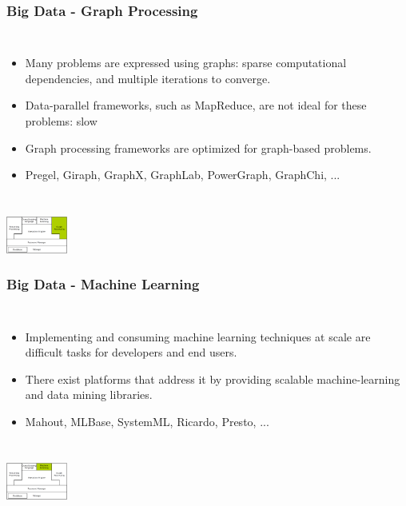 \documentclass{beamer}
\begin{document}
\begin{frame}
\frametitle{Big Data - Graph Processing}
\begin{columns}
\column{30em}
\begin{itemize}\itemsep1em
  \justifying
  \item Many problems are expressed using \textcolor{TextGreen}{graphs}: sparse \textcolor{Ocean}{computational dependencies}, and \textcolor{Ocean}{multiple iterations} to converge.
  \item Data-parallel frameworks, such as MapReduce, are not ideal for these problems: \textcolor{Ocean}{slow}
  \item Graph processing frameworks are \textcolor{Ocean}{optimized} for graph-based problems.
  \item Pregel, Giraph, GraphX, GraphLab, PowerGraph, GraphChi, ...
\end{itemize}
\end{columns}
\vspace{1.33cm}
\hspace*{10cm}\includegraphics[width=2cm]{figs/stack_graph.pdf}
\end{frame}

\begin{frame}
\frametitle{Big Data - Machine Learning}
\begin{columns}
\column{30em}
\begin{itemize}\itemsep1em
  \justifying
  \item Implementing and consuming machine learning techniques at scale are \textcolor{Ocean}{difficult tasks} for developers and end users.
  \item There exist platforms that address it by providing scalable machine-learning and data mining libraries.
  \item Mahout, MLBase, SystemML, Ricardo, Presto, ...
\end{itemize}
\end{columns}
\vspace{2.67cm}
\hspace*{10cm}\includegraphics[width=2cm]{figs/stack_ml.pdf}
\end{frame}
\end{document}
